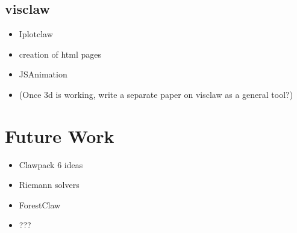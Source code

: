 \documentclass[]{siamltex}
\begin{document}
\subsection{visclaw}
\begin{itemize}
    \item Iplotclaw
    \item creation of html pages
    \item JSAnimation
    \item (Once 3d is working, write a separate paper on visclaw as a general tool?)
\end{itemize}

\section{Future Work}
\begin{itemize}
    \item Clawpack 6 ideas
    \item Riemann solvers
    \item ForestClaw
    \item ???
\end{itemize}
\end{document}
